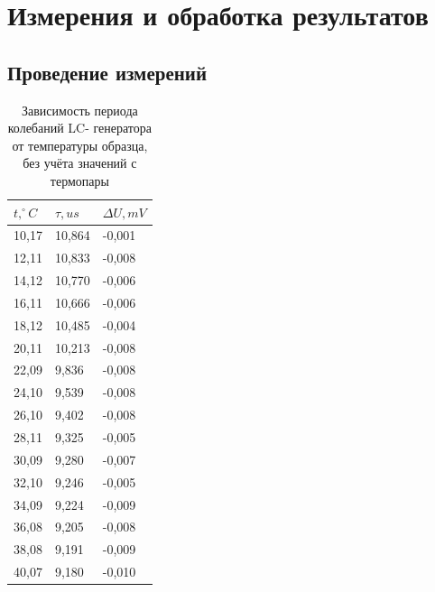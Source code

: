 \documentclass[a4paper]{article}
\begin{document}
	
	
	\section{Измерения и обработка результатов}

	
    \subsection{Проведение измерений}
\begin{table}[H]
    \centering
    \caption{Зависимость периода колебаний LC- генератора от температуры образца, без учёта значений с термопары}
    \begin{tabular}{|l|l|l|}
    \hline
    $t, ^\circ C$ & $\tau, us$ & $\Delta U, mV$\\\hline
        10,17 & 10,864 & -0,001 \\ \hline
        12,11 & 10,833 & -0,008 \\ \hline
        14,12 & 10,770 & -0,006 \\ \hline
        16,11 & 10,666 & -0,006 \\ \hline
        18,12 & 10,485 & -0,004 \\ \hline
        20,11 & 10,213 & -0,008 \\ \hline
        22,09 & 9,836 & -0,008 \\ \hline
        24,10 & 9,539 & -0,008 \\ \hline
        26,10 & 9,402 & -0,008 \\ \hline
        28,11 & 9,325 & -0,005 \\ \hline
        30,09 & 9,280 & -0,007 \\ \hline
        32,10 & 9,246 & -0,005 \\ \hline
        34,09 & 9,224 & -0,009 \\ \hline
        36,08 & 9,205 & -0,008 \\ \hline
        38,08 & 9,191 & -0,009 \\ \hline
        40,07 & 9,180 & -0,010 \\ \hline
    \end{tabular}
\end{table}
    
\end{document}
